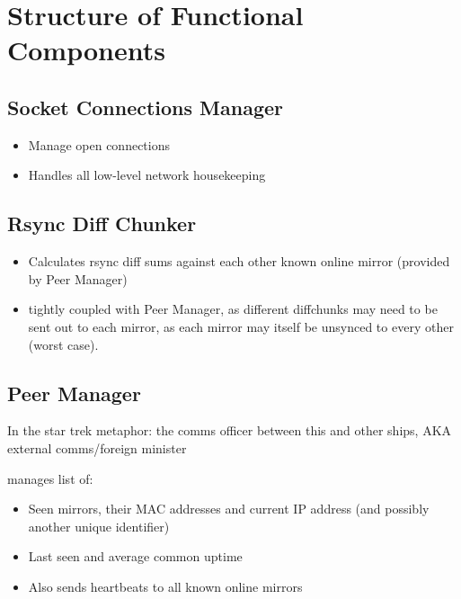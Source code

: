 \documentclass[12pt,a4paper,]{adreport}
\begin{document}
\chapter{Structure of Functional
Components}\label{structure-of-functional-components}

\section{Socket Connections Manager}\label{socket-connections-manager}

\begin{itemize}
\itemsep1pt\parskip0pt
\item
  Manage open connections
\item
  Handles all low-level network housekeeping
\end{itemize}

\section{Rsync Diff Chunker}\label{rsync-diff-chunker}

\begin{itemize}
\itemsep1pt\parskip0pt
\item
  Calculates rsync diff sums against each other known online mirror
  (provided by Peer Manager)
\item
  tightly coupled with Peer Manager, as different diffchunks may need to
  be sent out to each mirror, as each mirror may itself be unsynced to
  every other (worst case).
\end{itemize}

\section{Peer Manager}\label{peer-manager}

In the star trek metaphor: the comms officer between this and other
ships, AKA external comms/foreign minister

manages list of:

\begin{itemize}
\itemsep1pt\parskip0pt
\item
  Seen mirrors, their MAC addresses and current IP address (and possibly
  another unique identifier)
\item
  Last seen and average common uptime
\item
  Also sends heartbeats to all known online mirrors
\end{itemize}
\end{document}
